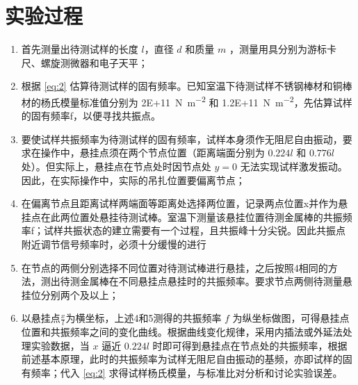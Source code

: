 \documentclass[a4paper,utf8]{article}
\begin{document}
\section{实验过程}%
    \begin{enumerate}
        \item 首先测量出待测试样的长度 $l$，直径 $d$ 和质量 $m$ ，测量用具分别为游标卡尺、螺旋测微器和电子天平；
        \item 根据 \eqref{eq:2} 估算待测试样的固有频率。已知室温下待测试样不锈钢棒材和铜棒材的杨氏模量标准值分别为 \SI{2E+11}{\N\per\m^2} 和 \SI{1.2E+11}{\N\per\m^2}，先估算试样的固有频率f，以便寻找共振点。
        \item 要使试样共振频率为待测试样的固有频率，试样本身须作无阻尼自由振动，要求在操作中，悬挂点须在两个节点位置（距离端面分别为 $0.224l$ 和 $0.776l$ 处）。但实际上，悬挂点在节点处时因节点处 $y=0$ 无法实现试样激发振动。因此，在实际操作中，实际的吊扎位置要偏离节点；
        \item 在偏离节点且距离试样两端面等距离处选择两位置，记录两点位置x并作为悬挂点在此两位置处悬挂待测试棒。室温下测量该悬挂位置待测金属棒的共振频率f；试样共振状态的建立需要有一个过程，且共振峰十分尖锐。因此共振点附近调节信号频率时，必须十分缓慢的进行
        \item 在节点的两侧分别选择不同位置对待测试棒进行悬挂，之后按照4相同的方法，测出待测金属棒在不同悬挂点悬挂时的共振频率。要求节点两侧待测量悬挂位分别两个及以上；
        \item 以悬挂点$\frac{x}{l}$为横坐标，上述4和5测得的共振频率 $f$ 为纵坐标做图，可得悬挂点位置和共振频率之间的变化曲线。根据曲线变化规律，采用内插法或外延法处理实验数据，当 $x$ 逼近 $0.224l$ 时即可得到悬挂点在节点处的共振频率，根据前述基本原理，此时的共振频率为试样无阻尼自由振动的基频，亦即试样的固有频率；代入 \eqref{eq:2} 求得试样杨氏模量，与标准比对分析和讨论实验误差。 
    \end{enumerate}
\end{document}
